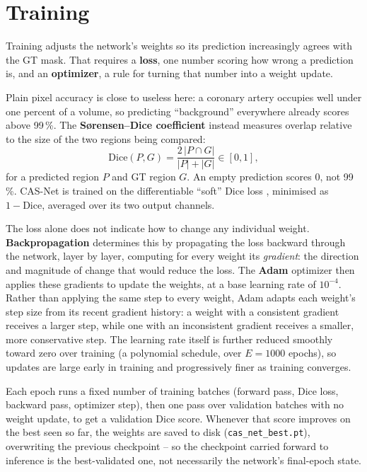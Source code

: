 
\section{Training}
\label{sec:pipeline-training}

Training adjusts the network's weights so its prediction increasingly agrees with the GT mask.
That requires a \textbf{loss}, one number scoring how wrong a prediction is, and an
\textbf{optimizer}, a rule for turning that number into a weight update.

Plain pixel accuracy is close to useless here: a coronary artery occupies well under one percent
of a volume, so predicting ``background'' everywhere already scores above 99\,\%. The
\textbf{Sørensen--Dice coefficient} instead measures overlap relative to the size of the two
regions being compared:
\begin{equation}
  \mathrm{Dice}(P, G) = \frac{2\,|P \cap G|}{|P| + |G|} \in [0, 1],
  \label{eq:pipeline-dice}
\end{equation}
for a predicted region $P$ and GT region $G$. An empty prediction scores 0, not 99\,\%. CAS-Net is
trained on the differentiable ``soft'' Dice loss \cite{milletari2016vnet}, minimised as
$1-\mathrm{Dice}$, averaged over its two output channels.

The loss alone does not indicate how to change any individual weight. \textbf{Backpropagation}
determines this by propagating the loss backward through the network, layer by layer, computing
for every weight its \emph{gradient}: the direction and magnitude of change that would reduce the
loss. The \textbf{Adam} optimizer \cite{kingma2015adam} then applies these gradients to update the
weights, at a base learning rate of $10^{-4}$. Rather than applying the same step to every weight,
Adam adapts each weight's step size from its recent gradient history: a weight with a consistent
gradient receives a larger step, while one with an inconsistent gradient receives a smaller, more
conservative step. The learning rate itself is further reduced smoothly toward zero over training
(a polynomial schedule, over $E=1000$ epochs), so updates are large early in training and
progressively finer as training converges.

Each epoch runs a fixed number of training batches (forward pass, Dice loss, backward pass,
optimizer step), then one pass over validation batches with no weight update, to get a validation
Dice score. Whenever that score improves on the best seen so far, the weights are saved to disk
(\texttt{cas\_net\_best.pt}), overwriting the previous checkpoint -- so the checkpoint carried
forward to inference is the best-validated one, not necessarily the network's final-epoch state.
